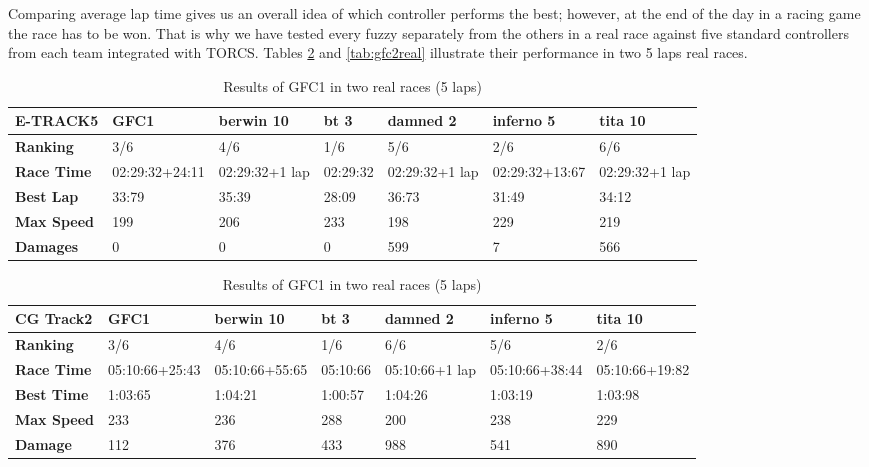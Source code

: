 \documentclass[conference]{IEEEtran}
\begin{document}
Comparing average lap time gives us an overall idea of which
controller performs the best; however, at the end of the day in a
racing game the race has to be won. That is why we have tested every
fuzzy separately from the others in a real race against five standard controllers from each team integrated with TORCS. Tables \ref{tab:gfc1real} and \ref{tab:gfc2real}   illustrate their performance in two 5 laps real races. 
\begin{table}[!ht]
	\centering
	{\scriptsize
		\caption{Results of GFC1 in two real races (5 laps)}
		\label{tab:gfc1real}
		\begin{tabular}{|p{2 cm}|p{1.5 cm}|p{1.5 cm}|p{1.5 cm}|p{1.5 cm}|p{1.5 cm}|p{1.5 cm}|}
			\hline \textbf{E-TRACK5} &   \textbf{GFC1} & \textbf{berwin 10} & \textbf{bt 3} &\textbf{damned 2} & \textbf{inferno 5} & \textbf{tita 10}  \\
			\hline \textbf{Ranking} & 3/6&4/6&1/6&5/6&2/6&6/6\\			
			\hline \textbf{Race Time}	& 02:29:32\newline+24:11&02:29:32\newline +1 lap &02:29:32&02:29:32\newline +1 lap &02:29:32\newline+13:67&02:29:32\newline+1 lap\\	
			\hline \textbf{Best Lap}&33:79& 35:39&28:09&36:73&31:49&34:12\\	
			\hline \textbf{Max Speed}& 199&206&233&198&229&219\\	
			\hline \textbf{Damages}& 0&0&0&599&7&566 \\	
			\hline 
		\end{tabular}
		
		\begin{tabular}{|p{2 cm}|p{1.5 cm}|p{1.5 cm}|p{1.5 cm}|p{1.5 cm}|p{1.5 cm}|p{1.5 cm}|}
			\hline \textbf{CG Track2} & \textbf{GFC1}&\textbf{berwin 10} & \textbf{bt 3} &\textbf{damned 2} & \textbf{inferno 5} & \textbf{tita 10}  \\
			\hline \textbf{Ranking} & 3/6&4/6&1/6&6/6&5/6&2/6\\			
			\hline \textbf{Race Time}	&  05:10:66\newline +25:43&  05:10:66\newline+55:65& 05:10:66& 05:10:66\newline+1 lap& 05:10:66\newline+38:44& 05:10:66\newline+19:82\\	
			\hline \textbf{Best Time}& 1:03:65 &1:04:21&1:00:57&1:04:26&1:03:19&1:03:98\\	
			\hline \textbf{Max Speed}& 233&236&288&200&238&229\\
			\hline \textbf{Damage}& 112& 376 & 433&988&541&890\\	
			\hline 
		\end{tabular}
	}
\end{table}
\end{document}
